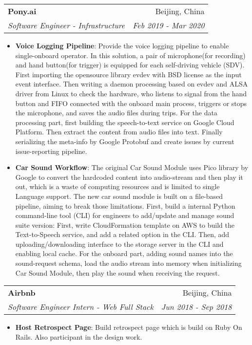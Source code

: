 \documentclass[letterpaper,11pt]{article}
\makeatletter
\newcommand{\resumeItem}[2]{
	\item\small{
		\textbf{#1}{: #2 \vspace{-2pt}}
	}
}
\newcommand{\resumeSubheading}[4]{
	\vspace{-1pt}\item
	\begin{tabular*}{0.97\textwidth}[t]{l@{\extracolsep{\fill}}r}
		\textbf{#1} & #2 \\
		\textit{\small#3} & \textit{\small #4} \\
	\end{tabular*}\vspace{-5pt}
}
\newcommand{\resumeSubSubheading}[2]{
	\begin{tabular*}{0.97\textwidth}{l@{\extracolsep{\fill}}r}
		\textit{\small#1} & \textit{\small #2} \\
	\end{tabular*}\vspace{-5pt}
}
\newcommand{\resumeSubHeadingListEnd}{\end{itemize}}
\newcommand{\resumeItemListStart}{\begin{itemize}}
\newcommand{\resumeItemListEnd}{\end{itemize}\vspace{-5pt}}
\makeatother
\begin{document}
\begin{spacing}{0.80}
	\resumeSubheading
	{Pony.ai}{Beijing, China}
	{Software Engineer - Infrastructure}{Feb 2019 - Mar 2020}
	\resumeItemListStart
	\resumeItem{Voice Logging Pipeline}
	{Provide the voice logging pipeline to enable single-onboard operator. In this solution, a pair of microphone(for recording) and hand button(for trigger) is equipped for each self-driving vehicle (SDV). First importing the opensource library evdev with BSD license as the input event interface. Then writing a daemon processing based on evdev and ALSA driver from Linux to check the hardware, who listens to signal from the hand button and FIFO connected with the onboard main process, triggers or stops the microphone, and saves the audio files during trips. For the data processing part, first building the speech-to-text service on Google Cloud Platform. Then extract the content from audio files into text. Finally serializing the meta-info by Google Protobuf and create issues by current issue-reporting pipeline.}
	\resumeItem{Car Sound Workflow}
	{The original Car Sound Module uses Pico library by Google to convert the hardcoded content into audio-stream and then play it out, which is a waste of computing resources and is limited to single Language support. The new car sound module is built on a file-based pipeline, aiming to break those limitations. First, build a internal Python command-line tool (CLI) for engineers to add/update and manage sound suite version: First, write CloudFormation template on AWS to build the Text-to-Speech service, and add a related option in the CLI. Then, add uploading/downloading interface to the storage server in the CLI and enabling local cache. For the onboard part, adding sound names into the sound-request schema, load the audio stream into memory when initializing Car Sound Module, then play the sound when receiving the request.}
	\resumeItemListEnd

	
	
	
	\resumeSubheading
	{Airbnb}{Beijing, China}
	{Software Engineer Intern - Web Full Stack}{Jun 2018 - Sep 2018}
	\resumeItemListStart
	\resumeItem{Host Retrospect Page}
	{Build retrospect page which is build on Ruby On Rails. Also participant in the design work.}
	\resumeItemListEnd
	

\end{spacing}
\end{document}
